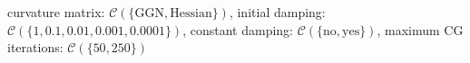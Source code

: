 curvature matrix: $\mathcal{C}(\{\text{GGN},\text{Hessian}\})$, initial damping: $\mathcal{C}(\{\num[scientific-notation=false]{1},\num[scientific-notation=true]{0.1},\num[scientific-notation=true]{0.01},\num[scientific-notation=true]{0.001},\num[scientific-notation=true]{0.0001}\})$, constant damping: $\mathcal{C}(\{\text{no},\text{yes}\})$, maximum CG iterations: $\mathcal{C}(\{\num[scientific-notation=false]{50},\num[scientific-notation=false]{250}\})$